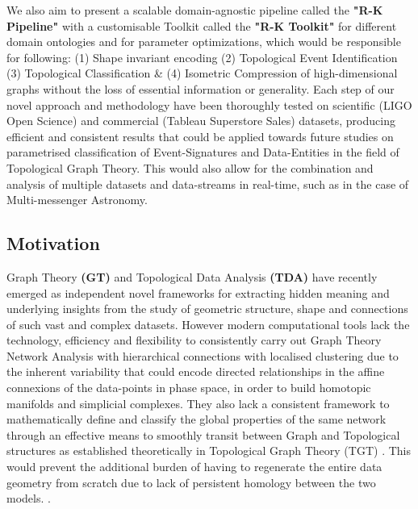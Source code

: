 We also aim to present a scalable domain-agnostic pipeline called the \textbf{"R-K Pipeline"} with a customisable Toolkit called the \textbf{"R-K Toolkit"} for different domain ontologies and for parameter optimizations, which would be responsible for following: (1) Shape invariant encoding (2) Topological Event Identification (3) Topological Classification \& (4) Isometric  Compression of high-dimensional graphs without the loss of essential information or generality.  Each step of our novel approach and methodology have been thoroughly tested on scientific (LIGO Open Science) \cite{01.5_LIGOOpenSci} \cite{00_LIGOOpenSciData} and commercial (Tableau Superstore Sales) datasets, producing efficient and consistent results that could be applied towards future studies on parametrised classification of Event-Signatures and Data-Entities in the field of Topological Graph Theory.\cite{17.1_2012foundationsTGT} This would also allow for the combination and analysis of multiple datasets and data-streams in real-time, such as in the case of Multi-messenger Astronomy.

\subsection{Motivation}

Graph Theory \textbf{(GT)} \cite{01.6_GTIntro} \cite{01.7_GTApplications} \cite{01.8_ModernGT} and Topological Data Analysis \textbf{(TDA) } \cite{01.3_2016TDANewOpportunities} \cite{01_GCarlssonEpstein2011} have recently emerged as independent novel frameworks for extracting hidden meaning and underlying insights from the study of geometric structure, shape and connections of such vast and complex datasets. \cite{02.3_2017introductionTDA} \cite{02.4_TDAResearch} However modern computational tools lack the technology, efficiency and flexibility to consistently carry out Graph Theory Network Analysis with hierarchical connections with localised clustering due to the inherent variability that could encode directed relationships in the affine connexions \cite{23.2_AffineConnection} \cite{23.1_7FundamentalQuants}
of the data-points in phase space, in order to build homotopic manifolds and simplicial complexes\cite{02.6_2009TDAChallenges}.\cite{01.9_2007MapperPBG} \cite{03.1_2009simplicialHomotopy}\cite{01_GCarlssonEpstein2011}  They also lack a consistent framework to mathematically define and classify the global properties of the same network through an effective means to smoothly transit between Graph and Topological structures as established theoretically in Topological Graph Theory (TGT)\cite{17.3_1996topologicalGT} \cite{17.4_TGTRecentResults}. This would prevent the additional burden of having to regenerate the entire data geometry from scratch due to lack of persistent homology between the two models.\cite{02_carlsson2009topology} \cite{03.3_de2007PersistentHomology} \cite{01_GCarlssonEpstein2011}.

